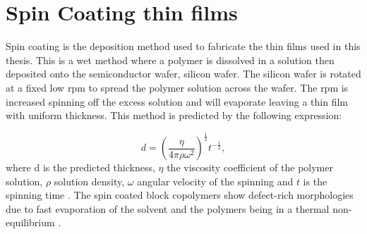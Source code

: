 \documentclass[MasterThesisMain.tex]{subfiles}
\begin{document}
\section{Spin Coating thin films}
Spin coating is the deposition method used to fabricate the thin films used in this thesis. This is a wet method where a polymer is dissolved in a solution then deposited onto the semiconductor wafer, silicon wafer. The silicon wafer is rotated at a fixed low rpm to spread the polymer solution across the wafer. The rpm is increased spinning off the excess solution and will evaporate leaving a thin film with uniform thickness. This method is predicted by the following expression:

\begin{equation}
d = \left(\frac{\eta}{4\pi\rho\omega^2}\right)^{\frac{1}{2}} t^{-\frac{1}{2}},
\end{equation}  
where d is the predicted thickness, $\eta$ the viscosity coefficient of the polymer solution, $\rho$ solution density, $\omega$ angular velocity of the spinning and $t$ is the spinning time \cite{petty2008molecular}. The spin coated block copolymers show defect-rich morphologies due to fast evaporation of the solvent and the polymers being in a thermal non-equilibrium \cite{PosseltBCP}.
\end{document}
